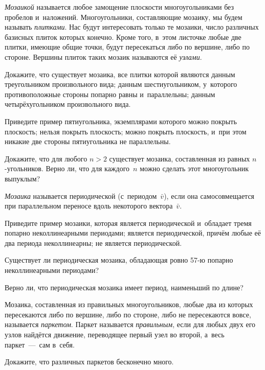 \documentclass[a4paper,12pt]{article}
\begin{document}

\emph{Мозаикой} называется любое замощение плоскости многоугольниками без пробелов и~наложений. Многоугольники, составляющие мозаику, мы будем называть \emph{плитками}. Нас будут интересовать только те мозаики, число различных базисных плиток которых конечно. Кроме того, в~этом листочке любые две плитки, имеющие общие точки, будут пересекаться либо по вершине, либо по стороне. Вершины плиток таких мозаик называются её \emph{узлами}.

Докажите, что существует мозаика, все плитки которой являются
 данным треугольником произвольного вида;
 данным шестиугольником, у~которого противоположные стороны попарно равны и~параллельны;
 данным четырёхугольником произвольного вида.

Приведите пример пятиугольника, экземплярами которого
 можно покрыть плоскость;
 нельзя покрыть плоскость;
 можно покрыть плоскость, и~при этом никакие две стороны пятиугольника не параллельны.

 Докажите, что для любого $n>2$ существует мозаика, составленная из равных $n$-угольников.
 Верно ли, что для каждого~$n$ можно сделать этот многоугольник выпуклым?

\emph{Мозаика} называется периодической (с~периодом~$\bar v$), если она самосовмещается при параллельном переносе вдоль некоторого вектора~$\bar v$.

Приведите пример мозаики, которая
 является периодической и~обладает тремя попарно неколлинеарными периодами;
 является периодической, причём любые её два периода неколлинеарны;
 не является периодической.

Существует ли периодическая мозаика, обладающая ровно 57-ю попарно неколлинеарными периодами?

Верно ли, что периодическая мозаика имеет период, наименьший по длине?

Мозаика, составленная из правильных многоугольников, любые два из которых пересекаются либо по вершине, либо по стороне, либо не пересекаются вовсе, называется \emph{паркетом}. Паркет называется \emph{правильным}, если для любых двух его узлов найдётся движение, переводящее первый узел во второй, а~весь паркет~---~сам в~себя.

Докажите, что различных паркетов бесконечно много.
\end{document}
